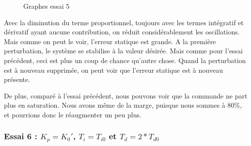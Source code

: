 \begin{figure}[H]
    \centering
    \caption{Graphes essai 5}
    \label{fig:essai-5}
\end{figure}

Avec la diminution du terme proportionnel, toujours avec les termes intégratif et dérivatif
ayant aucune contribution, on réduit considérablement les oscillations. Mais
comme on peut le voir, l'erreur statique est grande. A la première perturbation,
le système se stabilise à la valeur désirée. Mais comme pour l'essai précédent,
ceci est plus un coup de chance qu'autre chose. Quand la perturbation est à nouveau
supprimée, on peut voir que l'erreur statique est à nouveau présente.

De plus, comparé à l'essai précédent, nous pouvons voir que la commande ne part plus en saturation.
Nous avons même de la marge, puisque nous sommes à 80\%, et pourrions donc le réaugmenter un peu plus.


\subsubsection{Essai 6 : $K_{p} = K_{0}'$, $T_{i} = T_{i0}$ et $T_{d} = 2*T_{d0}$}


